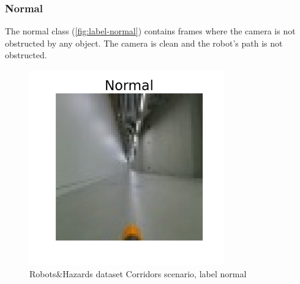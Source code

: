 
        \subsubsection*{Normal}
            The normal class (\autoref{fig:label-normal}) contains frames where the camera is not obstructed by any object. The camera is clean and the robot's path is not obstructed.
            \begin{figure}[H]
                \centering
                \centerline{\includegraphics[width=0.75\textwidth]{img/labels/normal.png}}
                \caption{Robots\&Hazards dataset Corridors scenario, label normal}
                \label{fig:label-normal}
            \end{figure}

